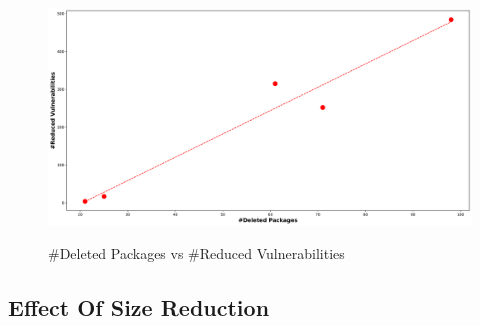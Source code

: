 \documentclass[a4paper,num-refs]{oup-contemporary}
\begin{document}

\begin{figure}
        {\includegraphics[scale=1.5,width=\textwidth]
        {Figures/graphwithdeletedpackages.pdf}}
	\caption{\label{deleted}\#Deleted Packages vs \#Reduced Vulnerabilities}
\end{figure}

\subsection{Effect Of Size Reduction}
\end{document}
